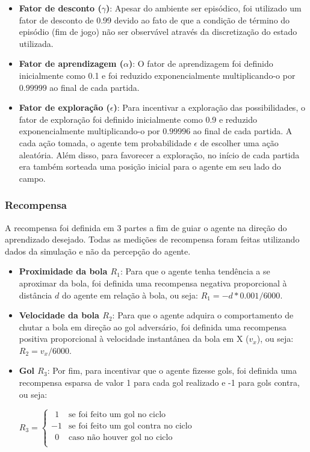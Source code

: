 \begin{itemize}
	\item \textbf{Fator de desconto ($\gamma$)}: Apesar do ambiente ser episódico, foi utilizado um fator de desconto de 0.99 devido ao fato de que a condição de término do episódio (fim de jogo) não ser observável através da discretização do estado utilizada.  
	
	\item \textbf{Fator de aprendizagem ($\alpha$)}: O fator de aprendizagem foi definido inicialmente como 0.1 e foi reduzido exponencialmente multiplicando-o por $0.99999$ ao final de cada partida. 
	
	\item \textbf{Fator de exploração ($\epsilon$)}: Para incentivar a exploração das possibilidades, o fator de exploração foi definido inicialmente como 0.9 e reduzido exponencialmente multiplicando-o por $0.99996$ ao final de cada partida. A cada ação tomada, o agente tem probabilidade $\epsilon$ de escolher uma ação aleatória. Além disso, para favorecer a exploração, no início de cada partida era também sorteada uma posição inicial para o agente em seu lado do campo.
\end{itemize}

\subsubsection{Recompensa}
\label{subsubsec:reward}

A recompensa foi definida em 3 partes a fim de guiar o agente na direção do aprendizado desejado. Todas as medições de recompensa foram feitas utilizando dados da simulação e não da percepção do agente.

\begin{itemize}
	\item \textbf{Proximidade da bola $R_1$}: Para que o agente tenha tendência a se aproximar da bola, foi definida uma recompensa negativa proporcional à distância $d$ do agente em relação à bola, ou seja: $R_1 = -d*0.001/6000$.
	
	\item \textbf{Velocidade da bola $R_2$}: Para que o agente adquira o comportamento de chutar a bola em direção ao gol adversário, foi definida uma recompensa positiva proporcional à velocidade instantânea da bola em X ($v_x$), ou seja: $R_2 = v_x/6000$.
	
	\item \textbf{Gol $R_3$}: Por fim, para incentivar que o agente fizesse gols, foi definida uma recompensa esparsa de valor 1 para cada gol realizado e -1 para gols contra, ou seja:
	
	$
	R_3 =
	\left\{
	\begin{array}{ll}
		\ \ 1  & \mbox{se foi feito um gol no ciclo} \\
		-1  & \mbox{se foi feito um gol contra no ciclo} \\
		\ \ 0  & \mbox{caso não houver gol no ciclo} \\
	\end{array}
	\right.
	$
\end{itemize}

